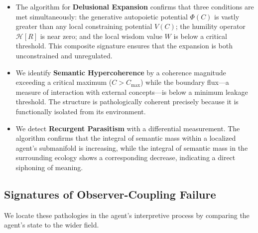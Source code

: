 \begin{itemize}

    \item The algorithm for \textbf{Delusional Expansion} confirms that three conditions are met simultaneously: the generative autopoietic potential \(\Phi(C)\) is vastly greater than any local constraining potential \(V(C)\); the humility operator \(\mathcal{H}[R]\) is near zero; and the local wisdom value \(W\) is below a critical threshold. This composite signature ensures that the expansion is both unconstrained and unregulated.

    \item We identify \textbf{Semantic Hypercoherence} by a coherence magnitude exceeding a critical maximum (\(C > C_{\text{max}}\)) while the boundary flux—a measure of interaction with external concepts—is below a minimum leakage threshold. The structure is pathologically coherent precisely because it is functionally isolated from its environment.

    \item We detect \textbf{Recurgent Parasitism} with a differential measurement. The algorithm confirms that the integral of semantic mass within a localized agent's submanifold is increasing, while the integral of semantic mass in the surrounding ecology shows a corresponding decrease, indicating a direct siphoning of meaning.

\end{itemize}


\subsection{Signatures of Observer-Coupling Failure}
\label{16.3.4:signatures_of_observer_coupling_failure}

We locate these pathologies in the agent's interpretive process by comparing the agent's state to the wider field.

